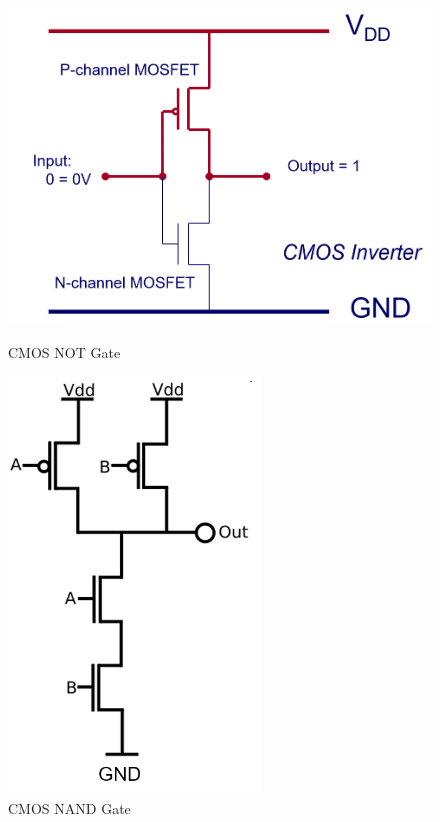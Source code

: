 \documentclass[12pt]{article}
\theoremstyle{definition}
\begin{document}
\begin{figure}[h]
\centering
\begin{minipage}{0.45\textwidth}
  \centering
  \includegraphics[width = \textwidth]{1_3.png}
  \caption{CMOS NOT Gate}
\end{minipage}
\hfill
\begin{minipage}{0.45\textwidth}
  \centering
  \includegraphics[width = 0.6\textwidth]{1_4.png}
  \caption{CMOS NAND Gate}
\end{minipage}
\end{figure}
\clearpage
\end{document}
